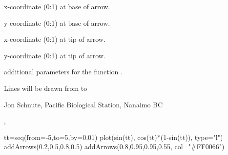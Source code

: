 \documentclass[letterpaper]{book}
\begin{document}
\begin{Arguments}
\begin{ldescription}
\item[\code{x1}] x-coordinate (0:1) at base of arrow.
\item[\code{y1}] y-coordinate (0:1) at base of arrow.
\item[\code{x2}] x-coordinate (0:1) at tip of arrow.
\item[\code{y2}] y-coordinate (0:1) at tip of arrow.
\item[\code{...}] additional parameters for the function .
\end{ldescription}
\end{Arguments}
\begin{Details}\relax
Lines will be drawn from  to 
\end{Details}
\begin{Author}\relax
Jon Schnute, Pacific Biological Station, Nanaimo BC
\end{Author}
\begin{SeeAlso}\relax
{}, 
\end{SeeAlso}
\begin{Examples}
\begin{ExampleCode}
tt=seq(from=-5,to=5,by=0.01)
plot(sin(tt), cos(tt)*(1-sin(tt)), type="l")
addArrows(0.2,0.5,0.8,0.5)
addArrows(0.8,0.95,0.95,0.55, col="#FF0066")
\end{ExampleCode}
\end{Examples}
\end{document}

